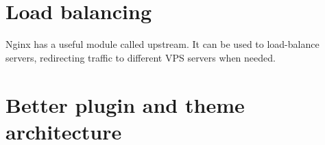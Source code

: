 \section{Load balancing}

Nginx has a useful module called upstream. It can be used to load-balance servers, redirecting traffic to different VPS servers when needed.

\section{Better plugin and theme architecture}

